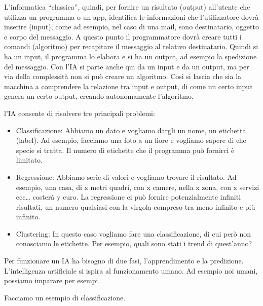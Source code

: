 \documentclass[12pt]{book} %
\begin{document}
L'informatica “classica”, quindi, per fornire un risultato (output) all'utente
che utilizza un programma o un app, identifica le informazioni che l'utilizzatore dovrà inserire
(input), come ad esempio, nel caso di una mail, sono destinatario, oggetto e corpo del messaggio. A questo punto il
programmatore dovrà creare tutti i comandi (algoritmo) per recapitare il messaggio al relativo destinatario. Quindi si
ha un input, il programma lo elabora e si ha un output, ad esempio la spedizione del messaggio. Con
l'IA si parte anche qui da un input e da un output, ma per via della complessità non si può creare
un algoritmo. Così si lascia che sia la macchina a comprendere la relazione tra input e output, di come un certo input
genera un certo output, creando autonomamente l'algoritmo.

l'IA consente di risolvere tre principali problemi: 

\begin{itemize}
\item Classificazione: Abbiamo un dato e vogliamo dargli un nome, un etichetta (label). Ad esempio, facciamo una foto a
un fiore e vogliamo sapere di che specie si tratta. Il numero di etichette che il programma può fornirci è limitato.
\item Regressione: Abbiamo serie di valori e vogliamo trovare il risultato. Ad esempio, una casa, di x metri quadri, con
x camere, nella x zona, con x servizi ecc… costerà y euro. La regressione ci può fornire potenzialmente infiniti
risultati, un numero qualsiasi con la virgola compreso tra meno infinito e più infinito.
\item Clustering: In questo caso vogliamo fare una classificazione, di cui però non conosciamo le etichette. Per
esempio, quali sono stati i trend di quest'anno?
\end{itemize}

Per funzionare un IA ha bisogno di due fasi, l'apprendimento e la predizione.
L'intelligenza artificiale si ispira al funzionamento umano. Ad esempio noi umani, possiamo imparare per esempi.

Facciamo un esempio di classificazione.
\end{document}
